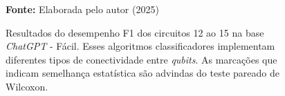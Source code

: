 \begin{figure}
\caption{Resultados do desempenho F1 dos circuitos 12 ao 15 na base \textit{ChatGPT} - Fácil. Esses algoritmos classificadores implementam diferentes tipos de conectividade entre \textit{qubits}. As marcações que indicam semelhança estatística são advindas do teste pareado de Wilcoxon.}
\label{fig:f1:easy:g3}
     \centering
    \centering

      \par\medskip\ABNTEXfontereduzida\selectfont\textbf{Fonte:} Elaborada pelo autor (2025) \par\medskip
\end{figure}
